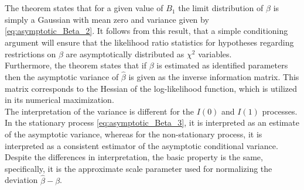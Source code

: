 \noindent The theorem states that for a given value of $B_1$ the limit distribution of $\hat{\beta}$ is simply a Gaussian with mean zero and variance given by \eqref{eq:asymptotic_Beta_2}. It follows from this result, that a simple conditioning argument will ensure that the likelihood ratio statistics for hypotheses regarding restrictions on $\beta$ are asymptotically distributed as $\chi^2$ variables.\\ 

\noindent Furthermore, the theorem states that if $\beta$ is estimated as identified parameters then the asymptotic variance of $\hat{\beta}$ is given as the inverse information matrix. This matrix corresponds to the Hessian of the log-likelihood function, which is utilized in its numerical maximization.\\

\noindent The interpretation of the variance is different for the $I(0)$ and $I(1)$ processes. In the stationary process \eqref{eq:asymptotic_Beta_3}, it is interpreted as an estimate of the asymptotic variance, whereas for the non-stationary process, it is interpreted as a consistent estimator of the asymptotic conditional variance. Despite the differences in interpretation, the basic property is the same, specifically, it is the approximate scale parameter used for normalizing the deviation $\hat{\beta} - \beta$.\\



